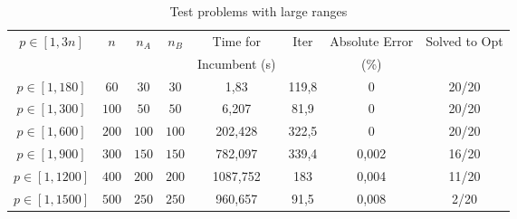 \documentclass[opre,nonblindrev]{informs3} %
\begin{document}
\begin{table*}[h]\scriptsize
	\begin{center}
		\begin{tabular}{||c| c |c | c|| c||c ||c|| c||}\hline
			\multirow{3}{*}{$p \in [1,3n]$} &\multirow{3}{*}{$n$} & \multirow{3}{*}{$n_A$} & \multirow{3}{*}{$n_B$} & \multirow{2}{*}{Time for } & \multirow{3}{*}{Iter}& \multirow{2}{*}{Absolute Error }& \multirow{3}{*}{Solved to Opt}\\
			& &  &&  && & \\
			& &  &&Incumbent (s)  &&(\%)& \\
			
			\hline
			$p\in[1,180]$	 & $60$ & $30$   & $30$   &  1,83
			&  119,8 &0&20/20
			\\
			
			$p\in[1,300]$	 & $100$ & $50$   & $50$   &  6,207
			& 81,9&0&20/20
			\\
			$p\in[1,600]$ &$200$  &  $100$	 & $100$ &202,428
			&322,5&0&20/20
			\\ 
			
			$p\in[1,900] $ & $300$	 & $150$   & $150$   & 782,097
			& 339,4 &0,002 & 16/20
			
			\\
			$p\in[1,1200]$ & $400$  & $200$	 & $200$ & 1087,752
			&183 &0,004&11/20
			
			\\ 
			
			$p\in[1,1500]$ & $500$	 & $250$   & $250$   & 960,657
			
			& 91,5
			&0,008 &2/20
			
			\\ \hline
			
		\end{tabular}
	\end{center}

	\caption{Test problems with large ranges} \label{largex}
\end{table*}
\end{document}

